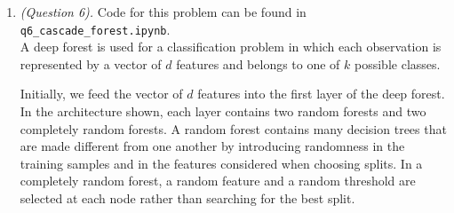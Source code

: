 \documentclass[12pt]{article}
\begin{document}
\begin{enumerate}
We could maximize this likelihood directly, but as before it is easier to work
with the log likelihood:

\[
\begin{aligned}
L
&= \log l \\
&= \sum_{i=1}^N
\log
\left[
\frac{1}{\sqrt{2\pi}\sigma(X_i)}
\exp\left(
-\frac{(Y_i-\mu(X_i))^2}{2\sigma^2(X_i)}
\right)
\right] \\
&= \sum_{i=1}^N
\left[
\log\left(
\frac{1}{\sqrt{2\pi}\sigma(X_i)}
\right)
-
\frac{(Y_i-\mu(X_i))^2}{2\sigma^2(X_i)}
\right] \\
&= \sum_{i=1}^N
\left[
-\frac{1}{2}\log(2\pi)
-\log\sigma(X_i)
-
\frac{(Y_i-\mu(X_i))^2}{2\sigma^2(X_i)}
\right].
\end{aligned}
\]

Maximum Likelihood Estimation seeks to maximize this quantity. However, the
loss function for the neural network is to be minimized, so we instead minimize
the negative log likelihood:

\[
\mathcal{L} = -L.
\]

Therefore,

\[
\boxed{
\mathcal{L}
=
\sum_{i=1}^N
\left[
\frac{1}{2}\log(2\pi)
+
\log\sigma(X_i)
+
\frac{(Y_i-\mu(X_i))^2}{2\sigma^2(X_i)}
\right]
}.
\]

Equivalently, using $\log(\sigma^2)=2\log\sigma$,

\[
\boxed{
\mathcal{L}
=
\frac{1}{2}
\sum_{i=1}^N
\left[
\log\left(2\pi\sigma^2(X_i)\right)
+
\frac{(Y_i-\mu(X_i))^2}{\sigma^2(X_i)}
\right]
}.
\]


\item \emph{(Question 6).} Code for this problem can be found in \texttt{q6\_cascade\_forest.ipynb}.\\

A deep forest is used for a classification problem in which each observation is represented by a vector of $d$ features and belongs to one of $k$ possible classes.

Initially, we feed the vector of $d$ features into the first layer of the deep forest. In the architecture shown, each layer contains two random forests and two completely random forests. A random forest contains many decision trees that are made different from one another by introducing randomness in the training samples and in the features considered when choosing splits. In a completely random forest, a random feature and a random threshold are selected at each node rather than searching for the best split.


\end{enumerate}
\end{document}

